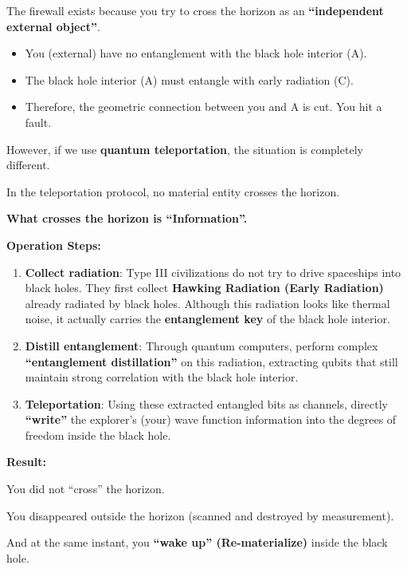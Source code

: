 The firewall exists because you try to cross the horizon as an \textbf{``independent external object''}.

\begin{itemize}
\item You (external) have no entanglement with the black hole interior (A).

\item The black hole interior (A) must entangle with early radiation (C).

\item Therefore, the geometric connection between you and A is cut. You hit a fault.
\end{itemize}

However, if we use \textbf{quantum teleportation}, the situation is completely different.

In the teleportation protocol, no material entity crosses the horizon.

\textbf{What crosses the horizon is ``Information''.}

\textbf{Operation Steps:}

\begin{enumerate}
\item \textbf{Collect radiation}: Type III civilizations do not try to drive spaceships into black holes. They first collect \textbf{Hawking Radiation (Early Radiation)} already radiated by black holes. Although this radiation looks like thermal noise, it actually carries the \textbf{entanglement key} of the black hole interior.

\item \textbf{Distill entanglement}: Through quantum computers, perform complex \textbf{``entanglement distillation''} on this radiation, extracting qubits that still maintain strong correlation with the black hole interior.

\item \textbf{Teleportation}: Using these extracted entangled bits as channels, directly \textbf{``write''} the explorer's (your) wave function information into the degrees of freedom inside the black hole.
\end{enumerate}

\textbf{Result:}

You did not ``cross'' the horizon.

You disappeared outside the horizon (scanned and destroyed by measurement).

And at the same instant, you \textbf{``wake up'' (Re-materialize)} inside the black hole.


